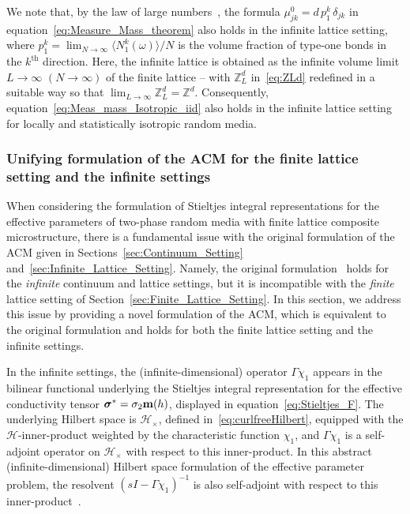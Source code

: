 \documentclass{cmslatex}
\newcommand\bsig{\mbox{\boldmath${\sigma}$}}
\begin{document}
We note that, by the law of large
numbers~\cite{Durrett:Book:Probability}, the formula
$\mu_{jk}^0=d\,p_1^k\,\delta_{jk}$ in
equation~\eqref{eq:Measure_Mass_theorem} also holds in the infinite
lattice setting, where $p_1^k=\lim_{N\to\infty}\langle N_1^k(\omega)\rangle/N$ is the volume fraction 
of type-one bonds in the $k^{\text{th}}$ direction. Here, the infinite
lattice is obtained as the infinite volume limit $L\to\infty$ $(N\to\infty)$ of the
finite lattice -- with $\mathbb{Z}_L^d$ in~\eqref{eq:ZLd} redefined in a
suitable way so that
$\lim_{L\to\infty}\mathbb{Z}_L^d=\mathbb{Z}^d$. Consequently,
equation~\eqref{eq:Meas_mass_Isotropic_iid} also holds in the infinite
lattice setting for locally and statistically isotropic random media. 






\subsubsection{Unifying formulation of the ACM for the finite lattice
  setting and the infinite settings}\label{sec:Unification_finite_infinite}
%
When considering the formulation of Stieltjes integral representations
for the effective parameters of two-phase random media with finite
lattice composite microstructure, there is a fundamental issue with
the original formulation of the ACM given in
Sections~\ref{sec:Continuum_Setting}
and~\ref{sec:Infinite_Lattice_Setting}. Namely, the original
formulation~\cite{Golden:CMP-473} holds for the
\emph{infinite} continuum and lattice settings, but it is incompatible
with the \emph{finite} lattice setting of
Section~\ref{sec:Finite_Lattice_Setting}. In this section, we address
this issue by providing a novel formulation of the ACM, which is
equivalent to the original formulation and holds for both the finite
lattice setting and the infinite settings.    




In the infinite settings, the (infinite-dimensional) operator $\Gamma\chi_1$
appears in the bilinear functional underlying the Stieltjes integral
representation for the effective conductivity tensor
$\bsig^*=\sigma_2\mathbf{m}(h)$, displayed in
equation~\eqref{eq:Stieltjes_F}. The underlying Hilbert space is 
$\mathscr{H}_\times$, defined in~\eqref{eq:curlfreeHilbert}, equipped with
the $\mathscr{H}$-inner-product weighted by the characteristic function $\chi_1$, and $\Gamma\chi_1$
is a self-adjoint operator on $\mathscr{H}_\times$ with respect to this
inner-product. In this abstract (infinite-dimensional) Hilbert space
formulation of the effective parameter problem, the resolvent
$(sI-\Gamma\chi_1)^{-1}$ is also self-adjoint with respect to this
inner-product~\cite{Stone:64}. 
\end{document}
